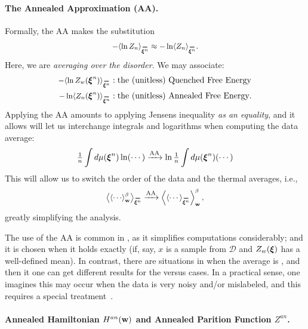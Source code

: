 \paragraph{The Annealed Approximation (AA).} 
Formally, the AA makes the substitution
\begin{align}
\label{eqn:AA}
-\langle\ln Z_{n}\rangle_{\AVGNDXIn}\approx-\ln \langle Z_{n}\rangle_{\AVGNDXIn}.
\end{align}
Here, we are \emph{averaging over the disorder}.
We may associate: 
\begin{eqnarray*}
    -\langle\ln Z_w(\NDXIn)\rangle_{\AVGNDXIn} &: \mbox{the (unitless) \Quenched \FreeEnergy} \\
    -\ln \langle Z_{n}(\NDXIn)\rangle_{\AVGNDXIn} &: \mbox{the (unitless) \Annealed \FreeEnergy}.
\end{eqnarray*}
Applying the AA amounts to applying Jensens inequality \emph{as an equality}, 
and it allows will let us interchange integrals and logarithms when computing the data average:
\begin{align}
\label{eqn:Jensens}
\tfrac{1}{n}\int d\mu(\boldsymbol{\xi}^{n})\ln(\cdots)   
\xrightarrow {\text{AA}}
\ln\tfrac{1}{n}\int d\mu(\boldsymbol{\xi}^{n})(\cdots)
\end{align}
This will allow us to switch the order of the data and the thermal averages, i.e.,
\begin{align}
\label{eqn:switch}
\left\langle \THRMAVGw{\cdots} \right\rangle_{\AVGNDXIn}
\xrightarrow{\text{AA}}
\THRMAVGw{\left\langle \cdots \right\rangle_{\AVGNDXIn}},
\end{align}
greatly simplifying the analysis.

The use of the AA is common in \STATMECH, as it simplifies computations considerably; and 
it is chosen when it holds exactly (if, say, $x$ is a \Typical sample from $\mathcal{D}$ and $Z_w(\boldsymbol{\xi})$ has a well-defined mean).
In contrast, there are situations in \STATMECH when the average is \ATypical, and then it one can get different results for the \Quenched versus \Annealed cases.  In a practical sense, one imagines this may occur when the data is very
noisy and/or mislabeled, and this requires a special treatment~\cite{SST92}.

\paragraph{Annealed Hamiltonian $H^{an}({\mathbf{w}})$ and Annealed Parition Function $Z^{an}$.}

